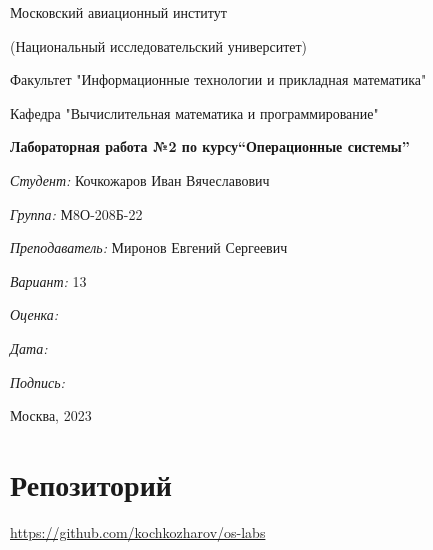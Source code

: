 \documentclass[a4paper, 12pt]{article}
\begin{document}
\thispagestyle{empty}
\begin{center}
    Московский авиационный институт

    (Национальный исследовательский университет)

    Факультет "Информационные технологии и прикладная математика"

    Кафедра "Вычислительная математика и программирование"

\end{center}
\vspace{40ex}
\begin{center}
    \textbf{\large{Лабораторная работа №2 по курсу\linebreak \textquotedblleft Операционные системы\textquotedblright}}
\end{center}
\vspace{35ex}
\begin{flushright}
    \textit{Студент: } Кочкожаров Иван Вячеславович

    \vspace{2ex}
    \textit{Группа: } М8О-208Б-22

    \vspace{2ex}
    \textit{Преподаватель: } Миронов Евгений Сергеевич

    \vspace{2ex}
    \textit{Вариант: } 13

    \vspace{2ex}
    \textit{Оценка: } \underline{\quad\quad\quad\quad\quad\quad}

    \vspace{2ex}
    \textit{Дата: } \underline{\quad\quad\quad\quad\quad\quad}

    \vspace{2ex}
    \textit{Подпись: } \underline{\quad\quad\quad\quad\quad\quad}

\end{flushright}

\vspace{5ex}

\begin{vfill}
    \begin{center}
        Москва, 2023
    \end{center}
\end{vfill}
\newpage

\begingroup
\color{black}
\tableofcontents\newpage
\endgroup

\section{Репозиторий}
\href{https://github.com/kochkozharov/os-labs}{https://github.com/kochkozharov/os-labs}
\end{document}
